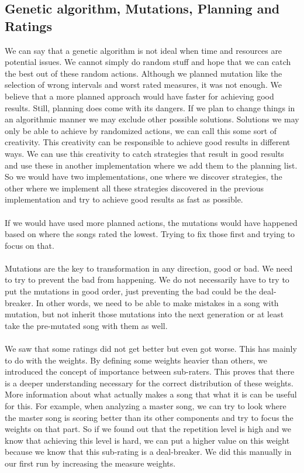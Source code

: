 \documentclass[a4paper]{article}
\begin{document}
\subsection{Genetic algorithm, Mutations, Planning and Ratings}
We can say that a genetic algorithm is not ideal when time and resources are potential issues. We cannot simply do random stuff and hope that we can catch the best out of these random actions. Although we planned mutation like the selection of wrong intervals and worst rated measures, it was not enough. We believe that a more planned approach would have faster for achieving good results. Still, planning does come with its dangers. If we plan to change things in an algorithmic manner we may exclude other possible solutions. Solutions we may only be able to achieve by randomized actions, we can call this some sort of creativity. This creativity can be responsible to achieve good results in different ways. We can use this creativity to catch strategies that result in good results and use these in another implementation where we add them to the planning list. So we would have two implementations, one where we discover strategies, the other where we implement all these strategies discovered in the previous implementation and try to achieve good results as fast as possible.
\\\\
If we would have used more planned actions, the mutations would have happened based on where the songs rated the lowest. Trying to fix those first and trying to focus on that. 
\\\\
Mutations are the key to transformation in any direction, good or bad. We need to try to prevent the bad from happening. We do not necessarily have to try to put the mutations in good order, just preventing the bad could be the deal-breaker. In other words, we need to be able to make mistakes in a song with mutation, but not inherit those mutations into the next generation or at least take the pre-mutated song with them as well.
\\\\
We saw that some ratings did not get better but even got worse. This has mainly to do with the weights. By defining some weights heavier than others, we introduced the concept of importance between sub-raters. This proves that there is a deeper understanding necessary for the correct distribution of these weights. More information about what actually makes a song that what it is can be useful for this. For example, when analyzing a master song, we can try to look where the master song is scoring better than its other components and try to focus the weights on that part. So if we found out that the repetition level is high and we know that achieving this level is hard, we can put a higher value on this weight because we know that this sub-rating is a deal-breaker. We did this manually in our first run by increasing the measure weights.
\end{document}
